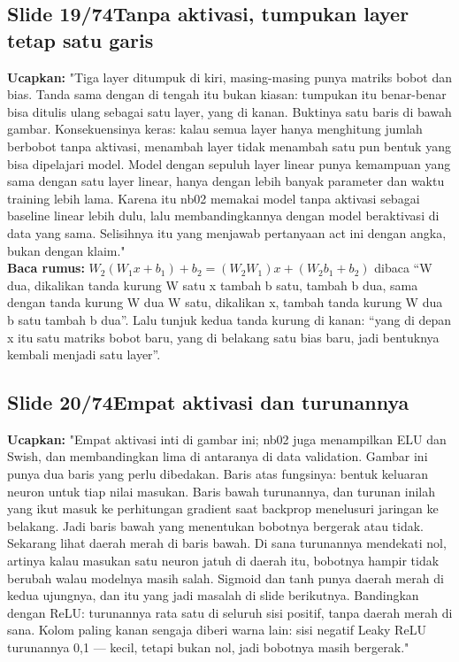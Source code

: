 \documentclass[11pt]{article}
\renewcommand{\framebox}[1]{\colorbox{acc!15}{\textcolor{acc}{\textbf{#1}}}}
\begin{document}
\subsection*{\framebox{Slide 19/74}\quad Tanpa aktivasi, tumpukan layer tetap satu garis}
\textbf{Ucapkan:} "Tiga layer ditumpuk di kiri, masing-masing punya matriks bobot dan bias. Tanda sama dengan di tengah itu bukan kiasan: tumpukan itu benar-benar bisa ditulis ulang sebagai satu layer, yang di kanan. Buktinya satu baris di bawah gambar. Konsekuensinya keras: kalau semua layer hanya menghitung jumlah berbobot tanpa aktivasi, menambah layer tidak menambah satu pun bentuk yang bisa dipelajari model. Model dengan sepuluh layer linear punya kemampuan yang sama dengan satu layer linear, hanya dengan lebih banyak parameter dan waktu training lebih lama. Karena itu nb02 memakai model tanpa aktivasi sebagai baseline linear lebih dulu, lalu membandingkannya dengan model beraktivasi di data yang sama. Selisihnya itu yang menjawab pertanyaan act ini dengan angka, bukan dengan klaim."\\[2pt]
\textbf{Baca rumus:} $W_2\left(W_1x + b_1\right) + b_2 = \left(W_2W_1\right)x + \left(W_2b_1 + b_2\right)$ dibaca ``W dua, dikalikan tanda kurung W satu x tambah b satu, tambah b dua, sama dengan tanda kurung W dua W satu, dikalikan x, tambah tanda kurung W dua b satu tambah b dua''. Lalu tunjuk kedua tanda kurung di kanan: ``yang di depan x itu satu matriks bobot baru, yang di belakang satu bias baru, jadi bentuknya kembali menjadi satu layer''.\\[2pt]

\subsection*{\framebox{Slide 20/74}\quad Empat aktivasi dan turunannya}
\textbf{Ucapkan:} "Empat aktivasi inti di gambar ini; nb02 juga menampilkan ELU dan Swish, dan membandingkan lima di antaranya di data validation. Gambar ini punya dua baris yang perlu dibedakan. Baris atas fungsinya: bentuk keluaran neuron untuk tiap nilai masukan. Baris bawah turunannya, dan turunan inilah yang ikut masuk ke perhitungan gradient saat backprop menelusuri jaringan ke belakang. Jadi baris bawah yang menentukan bobotnya bergerak atau tidak. Sekarang lihat daerah merah di baris bawah. Di sana turunannya mendekati nol, artinya kalau masukan satu neuron jatuh di daerah itu, bobotnya hampir tidak berubah walau modelnya masih salah. Sigmoid dan tanh punya daerah merah di kedua ujungnya, dan itu yang jadi masalah di slide berikutnya. Bandingkan dengan ReLU: turunannya rata satu di seluruh sisi positif, tanpa daerah merah di sana. Kolom paling kanan sengaja diberi warna lain: sisi negatif Leaky ReLU turunannya 0,1 — kecil, tetapi bukan nol, jadi bobotnya masih bergerak."\\[2pt]
\end{document}
